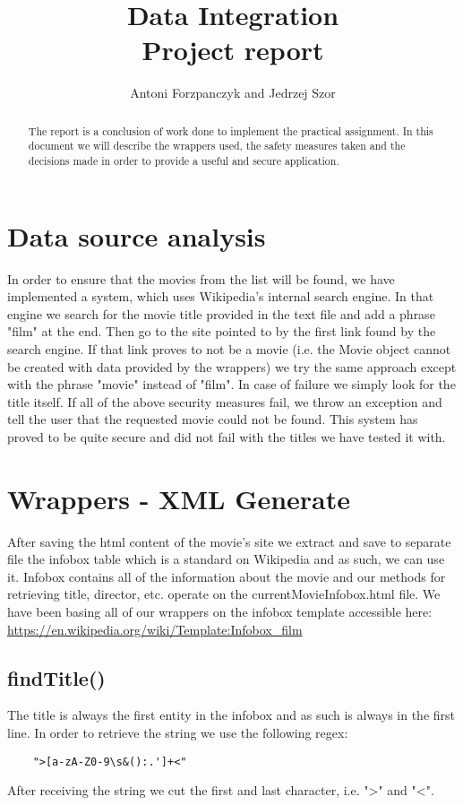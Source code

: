 \documentclass[a4paper,12pt]{article}
\begin{document}
	
\title{Data Integration\\Project report}
\author{Antoni Forzpanczyk and Jedrzej Szor}

\maketitle

\begin{abstract}
The report is a conclusion of work done to implement the practical assignment. In this document we will describe the wrappers used, the safety measures taken and the decisions made in order to provide a useful and secure application.
\end{abstract}

\section{Data source analysis}
In order to ensure that the movies from the list will be found, we have implemented a system, which uses Wikipedia's internal search engine. In that engine we search for the movie title provided in the text file and add a phrase "film" at the end. Then go to the site pointed to by the first link found by the search engine. If that link proves to not be a movie (i.e. the Movie object cannot be created with data provided by the wrappers) we try the same approach except with the phrase "movie" instead of "film". In case of failure we simply look for the title itself. If all of the above security measures fail, we throw an exception and tell the user that the requested movie could not be found. This system has proved to be quite secure and did not fail with the titles we have tested it with.

\section{Wrappers - XML Generate}
After saving the html content of the movie's site we extract and save to separate file the infobox table which is a standard on Wikipedia and as such, we can use it. Infobox contains all of the information about the movie and our methods for retrieving title, director, etc. operate on the currentMovieInfobox.html file. We have been basing all of our wrappers on the infobox template accessible here: \url{https://en.wikipedia.org/wiki/Template:Infobox_film}

\subsection{findTitle()}
The title is always the first entity in the infobox and as such is always in the first line. In order to retrieve the string we use the following regex:
\begin{lstlisting}
	">[a-zA-Z0-9\s&():.']+<"
\end{lstlisting}
After receiving the string we cut the first and last character, i.e. ">" and "<".
\end{document}
